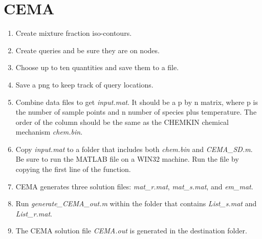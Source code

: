 \documentclass[11pt,english]{article}
\begin{document}
\section{CEMA}
\begin{enumerate}
  \item Create mixture fraction iso-contours.
  \item Create queries and be sure they are on nodes.
  \item Choose up to ten quantities and save them to a file.
  \item Save a png to keep track of query locations.
  \item Combine data files to get \emph{input.mat}.  It should be a p by n matrix, where p is the number of sample points and n number of species plus temperature.  The order of the column should be the same as the CHEMKIN chemical mechanism \emph{chem.bin}.
  \item Copy \emph{input.mat} to a folder that includes both \emph{chem.bin} and \emph{CEMA\_SD.m}.  Be sure to run the MATLAB file on a WIN32 machine.  Run the file by copying the first line of the function.
  \item CEMA generates three solution files: \emph{mat\_r.mat}, \emph{mat\_s.mat}, and \emph{em\_mat}.  \item Run \emph{generate\_CEMA\_out.m} within the folder that contains \emph{List\_s.mat} and \emph{List\_r.mat}.
  \item The CEMA solution file \emph{CEMA.out} is generated in the destination folder.  
\end{enumerate}
\end{document}
